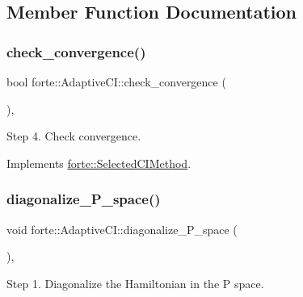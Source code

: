 \subsection{Member Function Documentation}
\mbox{\label{classforte_1_1_adaptive_c_i_a2682a80aa48f7cd49c295efb826f30ca}} 
\subsubsection{\texorpdfstring{check\+\_\+convergence()}{check\_convergence()}}
{\footnotesize\ttfamily bool forte\+::\+Adaptive\+C\+I\+::check\+\_\+convergence (\begin{DoxyParamCaption}{ }\end{DoxyParamCaption})\hspace{0.3cm}{\ttfamily [override]}, {\ttfamily [virtual]}}



Step 4. Check convergence. 



Implements \mbox{\hyperlink{classforte_1_1_selected_c_i_method_acc10aa488c79c2abec46a9093ecf5a52}{forte\+::\+Selected\+C\+I\+Method}}.

\mbox{\label{classforte_1_1_adaptive_c_i_a3673ea1f26ce6b24e35def54b14fe62f}} 
\subsubsection{\texorpdfstring{diagonalize\+\_\+\+P\+\_\+space()}{diagonalize\_P\_space()}}
{\footnotesize\ttfamily void forte\+::\+Adaptive\+C\+I\+::diagonalize\+\_\+\+P\+\_\+space (\begin{DoxyParamCaption}{ }\end{DoxyParamCaption})\hspace{0.3cm}{\ttfamily [override]}, {\ttfamily [virtual]}}



Step 1. Diagonalize the Hamiltonian in the P space. 



